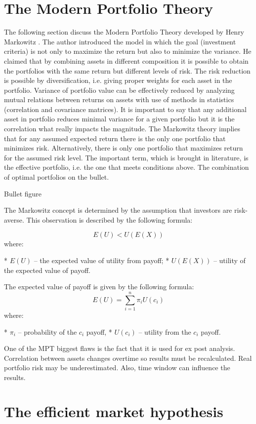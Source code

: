 \documentclass{article}\usepackage[]{graphicx}\usepackage[]{color}
\begin{document}
\section{The Modern Portfolio Theory}
The following section discuss the Modern Portfolio Theory developed by Henry Markowitz \cite{Markowitz1952}. The author introduced the model in which the goal
(investment criteria) is 
not only to maximize the return but also to minimize the variance. He claimed that by combining assets in different composition it is possible to obtain the 
portfolios with the same return but different levels of risk. The risk reduction is possible by diversification, i.e. giving proper weights for each asset 
in the portfolio. Variance of portfolio value can be effectively reduced by analyzing mutual relations between returns on assets with use of methods in statistics
(correlation and covariance matrices). It is important to say that any additional asset in portfolio reduces minimal variance for a given portfolio 
but it is the correlation what really impacts the magnitude.
The Markowitz theory implies that for any assumed expected return there is the only one portfolio that minimizes risk. Alternatively, there is only one portfolio 
that maximizes return for the assumed risk level. The important term, which is brought in literature, is the effective portfolio, i.e. the one that meets conditions
above.
The combination of optimal portfolios on the bullet.

Bullet figure

The Markowitz concept is determined by the assumption that investors are risk-averse. This observation is described by the following formula:

$$
E(U)<U(E(X))
$$
where:

* $E(U)$ -- the expected value of utility from payoff;
* $U(E(X))$ -- utility of the expected value of payoff.

The expected value of payoff is given by the following formula:
$$
E(U)=\sum_{i=1}^{n}\pi_iU(c_i)
$$
where:

* $\pi_i$ -- probability of the $c_i$ payoff,
* $U(c_i)$ -- utility from the $c_i$ payoff.

One of the MPT biggest flaws is the fact that it is used for ex post analysis. Correlation between assets changes overtime so results must be recalculated. Real portfolio risk may be underestimated. Also, time window can influence the results.

\section{The efficient market hypothesis}
\end{document}
